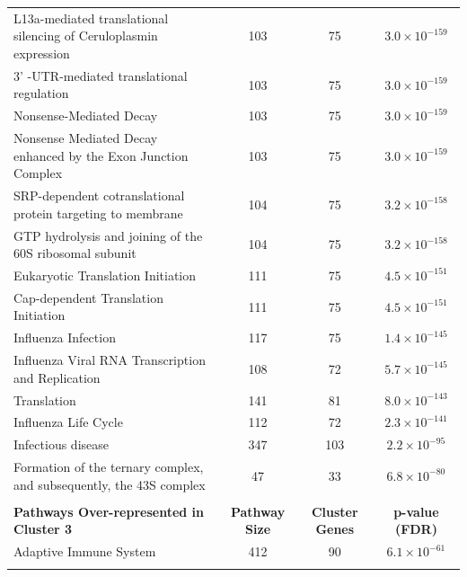 \begin{table}[!hp]
{\begin{tabular}{lccc}
  \rowcolor{Cluster_Green!20} 
  L13a-mediated translational silencing of Ceruloplasmin expression & 103 &  75 & $3.0 \times 10^{-159}$ \\
  \rowcolor{Cluster_Green!15} 
  3' -UTR-mediated translational regulation & 103 &  75 & $3.0 \times 10^{-159}$ \\
  \rowcolor{Cluster_Green!20} 
  Nonsense-Mediated Decay & 103 &  75 & $3.0 \times 10^{-159}$ \\
  \rowcolor{Cluster_Green!15} 
  Nonsense Mediated Decay enhanced by the Exon Junction Complex & 103 &  75 & $3.0 \times 10^{-159}$ \\
  \rowcolor{Cluster_Green!20} 
  SRP-dependent cotranslational protein targeting to membrane & 104 &  75 & $3.2 \times 10^{-158}$ \\
  \rowcolor{Cluster_Green!15} 
  GTP hydrolysis and joining of the 60S ribosomal subunit & 104 &  75 & $3.2 \times 10^{-158}$ \\
  \rowcolor{Cluster_Green!20} 
  Eukaryotic Translation Initiation & 111 &  75 & $4.5 \times 10^{-151}$ \\
  \rowcolor{Cluster_Green!15} 
  Cap-dependent Translation Initiation & 111 &  75 & $4.5 \times 10^{-151}$ \\
  \rowcolor{Cluster_Green!20} 
  Influenza Infection & 117 &  75 & $1.4 \times 10^{-145}$ \\
  \rowcolor{Cluster_Green!15} 
  Influenza Viral RNA Transcription and Replication & 108 &  72 & $5.7 \times 10^{-145}$ \\
  \rowcolor{Cluster_Green!20} 
  Translation & 141 &  81 & $8.0 \times 10^{-143}$ \\
  \rowcolor{Cluster_Green!15} 
  Influenza Life Cycle & 112 &  72 & $2.3 \times 10^{-141}$ \\
  \rowcolor{Cluster_Green!20} 
  Infectious disease & 347 & 103 & $2.2 \times 10^{-95}$ \\
  \rowcolor{Cluster_Green!15} 
  Formation of the ternary complex, and subsequently, the 43S complex &  47 &  33 & $6.8 \times 10^{-80}$ \\
  \hline
  \\
  \cellcolor{white} \large{\textbf{Pathways Over-represented in Cluster 3}} & \large{\textbf{Pathway Size}} & \large{\textbf{Cluster Genes}} & \large{\textbf{p-value (FDR)}} \\ %
  \hline
  \rowcolor{Cluster_Orange!30}
  Adaptive Immune System & 412 &  90 & $6.1 \times 10^{-61}$ \\
  \rowcolor{Cluster_Orange!20} 

\end{tabular}}
\end{table}
